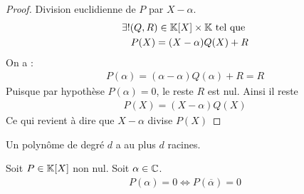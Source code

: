 \begin{proof}
Division euclidienne de $P$ par $X - \alpha$.
\begin{align*}
\exists ! (Q, R) \in \mathbb{K}[X] \times \mathbb{K} \text{ tel que } \\
P(X) = (X - \alpha) Q(X) + R
\end{align*}
On a :
\begin{align*}
P(\alpha) = (\alpha - \alpha) Q(\alpha) + R = R
\end{align*}
Puisque par hypothèse $P(\alpha) = 0$, le reste $R$ est nul.
Ainsi il reste
\begin{align*}
P(X) = (X - \alpha) Q(X)
\end{align*}
Ce qui revient à dire que $X - \alpha$ divise $P(X)$
\end{proof}

\begin{graybox}
\begin{corollaire}
Un polynôme de degré $d$ a au plus $d$ racines.
\end{corollaire}
\end{graybox}

\begin{graybox}
\begin{proposition}
Soit $P \in \mathbb{K}[X]$ non nul. Soit $\alpha \in \mathbb{C}$.
\begin{align*}
P(\alpha) = 0 \iff P(\overline{\alpha}) = 0
\end{align*}
\end{proposition}
\end{graybox}

